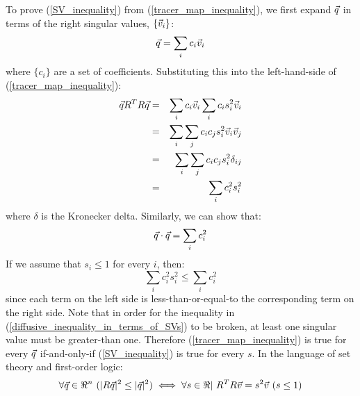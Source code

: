 To prove (\ref{SV_inequality}) from (\ref{tracer_map_inequality}), we first
expand $\vec q$ in terms of the right singular values, 
$\lbrace \vec v_i \rbrace$:
\begin{equation}
	\vec q = \sum_i c_i \vec v_i
\end{equation}
where $\lbrace c_i \rbrace$ are a set of coefficients.
Substituting this into the left-hand-side of (\ref{tracer_map_inequality}):
\begin{eqnarray}
	\vec q R^T R \vec q & = & \sum_i c_i \vec v_i \sum_i c_i s_i^2 \vec v_i \\
   & = & \sum_i \sum_j c_i c_j s_i^2 \vec v_i \vec v_j \\
   & = & \sum_i \sum_j c_i c_j s_i^2 \delta_{ij} \\
	  & = & \sum_i c_i^2 s_i^2
\end{eqnarray}
where $\delta$ is the Kronecker delta.
Similarly, we can show that:
\begin{equation}
	\vec q \cdot \vec q = \sum_i c_i^2
\end{equation}
If we assume that $s_i \le 1$ for every $i$, then:
\begin{equation}
	\sum_i c_i^2 s_i^2 \le \sum_i c_i^2 
	\label{diffusive_inequality_in_terms_of_SVs}
\end{equation}
since each term on the left side is less-than-or-equal-to the
corresponding term on the right side. 
Note that in order for the inequality in 
(\ref{diffusive_inequality_in_terms_of_SVs}) to be broken, at least one
singular value must be greater-than one.
Therefore (\ref{tracer_map_inequality}) is true for every $\vec q$
if-and-only-if (\ref{SV_inequality}) is true for every $s$.
In the language of set theory and first-order logic:
\begin{equation}
	\forall \vec q \in \Re^n ~ (| R \vec q |^2 \le |\vec q |^2) \iff \forall s \in \Re | ~R^T R \vec v = s^2 \vec v ~ (s \le 1)
	\label{theorem}
\end{equation}

